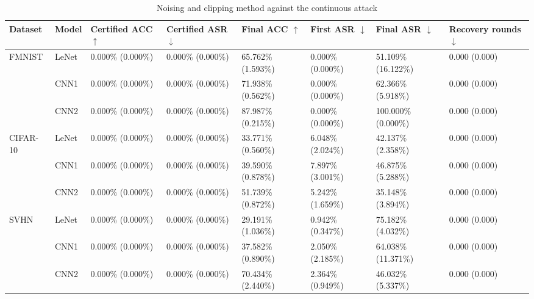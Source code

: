 \documentclass[conference,compsoc]{IEEEtran}
\begin{document}
\begin{landscape}
\begin{table}[H]
\centering
\caption{Noising and clipping method against the continuous attack}
\begin{tabular}{llllllll}
\hline
\textbf{Dataset} & \textbf{Model} & \textbf{Certified ACC} $\uparrow$ & \textbf{Certified ASR} $\downarrow$ & \textbf{Final ACC} $\uparrow$ & \textbf{First ASR} $\downarrow$ & \textbf{Final ASR} $\downarrow$ & \textbf{Recovery rounds} $\downarrow$ \\
\hline
\multirow{3}{*}{FMNIST} & LeNet & 0.000\% (0.000\%) & 0.000\% (0.000\%) & 65.762\% (1.593\%) & 0.000\% (0.000\%) & 51.109\% (16.122\%) & 0.000 (0.000) \\
& CNN1 & 0.000\% (0.000\%) & 0.000\% (0.000\%) & 71.938\% (0.562\%) & 0.000\% (0.000\%) & 62.366\% (5.918\%) & 0.000 (0.000) \\
& CNN2 & 0.000\% (0.000\%) & 0.000\% (0.000\%) & 87.987\% (0.215\%) & 0.000\% (0.000\%) & 100.000\% (0.000\%) & 0.000 (0.000) \\
\hline
\multirow{3}{*}{CIFAR-10} & LeNet & 0.000\% (0.000\%) & 0.000\% (0.000\%) & 33.771\% (0.560\%) & 6.048\% (2.024\%) & 42.137\% (2.358\%) & 0.000 (0.000) \\
& CNN1 & 0.000\% (0.000\%) & 0.000\% (0.000\%) & 39.590\% (0.878\%) & 7.897\% (3.001\%) & 46.875\% (5.288\%) & 0.000 (0.000) \\
& CNN2 & 0.000\% (0.000\%) & 0.000\% (0.000\%) & 51.739\% (0.872\%) & 5.242\% (1.659\%) & 35.148\% (3.894\%) & 0.000 (0.000) \\
\hline
\multirow{3}{*}{SVHN} & LeNet & 0.000\% (0.000\%) & 0.000\% (0.000\%) & 29.191\% (1.036\%) & 0.942\% (0.347\%) & 75.182\% (4.032\%) & 0.000 (0.000) \\
& CNN1 & 0.000\% (0.000\%) & 0.000\% (0.000\%) & 37.582\% (0.890\%) & 2.050\% (2.185\%) & 64.038\% (11.371\%) & 0.000 (0.000) \\
& CNN2 & 0.000\% (0.000\%) & 0.000\% (0.000\%) & 70.434\% (2.440\%) & 2.364\% (0.949\%) & 46.032\% (5.337\%) & 0.000 (0.000) \\
\hline
\end{tabular}
\end{table}


\end{landscape}
\end{document}
